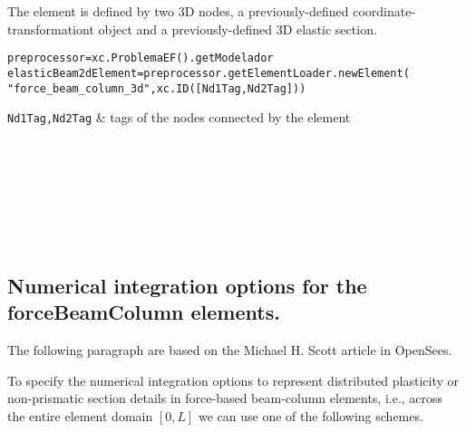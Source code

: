 The element is defined by two 3D nodes, a previously-defined coordinate-transformationt object and a previously-defined 3D elastic section.
\begin{verbatim}
preprocessor=xc.ProblemaEF().getModelador
elasticBeam2dElement=preprocessor.getElementLoader.newElement(
"force_beam_column_3d",xc.ID([Nd1Tag,Nd2Tag]))
\end{verbatim}
\begin{paramFuncTable}
{\tt Nd1Tag,Nd2Tag} & tags of the nodes connected by the element\\
\end{paramFuncTable}
\begin{paramClassTable}
\ElementParam{}
\ElementOneDParam{}
\rhoX{}
\end{paramClassTable}

\begin{methodsTable}
\ElementMeth{}
\ElementOneDMeth{}
\BeamColumnWithSectionFDMeth{}
\getVDirEjeFuerteLocales{} \\
\getVDirEjeDebilLocales{} \\
\getAnguloEjeFuerte{} \\
\getAnguloEjeDebil{} \\
\getVDirEjeFuerteGlobales{} \\
\getVDirEjeDebilGlobales{} \\
\end{methodsTable}

\subsection{Numerical integration options for the forceBeamColumn elements.}
The following paragraph are based on the Michael H. Scott article in OpenSees.

To specify the numerical integration options to represent distributed plasticity or non-prismatic section details in force-based beam-column elements, i.e., across the entire element domain $[0, L]$ we can use one of the following schemes.
